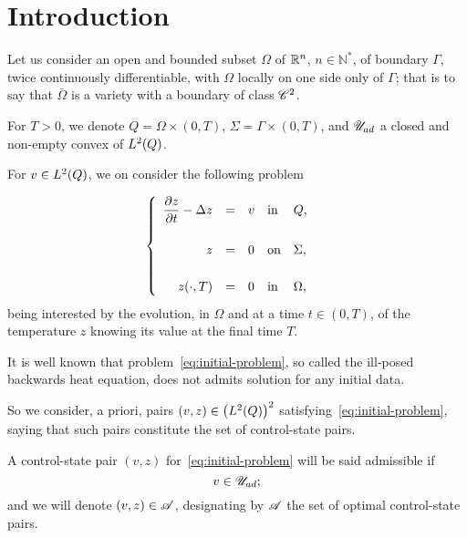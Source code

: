 \section{Introduction}

Let us consider an open and bounded subset $\Omega$ of ${\mathbb{R}}^{n}$, $n\in
{\mathbb{N}}^{*}$, of boundary ${\Gamma}$, twice continuously
differentiable, with $\Omega$ locally on one side only of $\Gamma$; that is
to say that $\bar{\Omega}$ is a variety with a boundary of class
${\mathscr{C}}^{2}$.

For $T > 0$, we denote $\displaystyle Q = \Omega\times(0,T)$, $\displaystyle
\Sigma = \Gamma\times (0,T)$, and $\displaystyle {\mathscr{U}}_{ad}$ a closed and
non-empty convex of $L^{2}\!\left({Q}\right)$.

For $v\in L^{2}\!\left({Q}\right)$, we on consider the following problem

\begin{equation}\label{eq:initial-problem}
    \begin{cases}\displaystyle
        \begin{array}{rclll}
            \dfrac{\partial{}z}{\partial{}t} - \Delta z & = & v & \text{in} & Q,\\
            \\
            z & = & 0 & \text{on} & \Sigma,\\
            \\
            {z}\!\left({\cdot,T}\right) & = & 0 & \text{in} & \Omega,
        \end{array}
    \end{cases}
\end{equation}
being interested by the evolution, in $\Omega$ and at a time $t\in (0,T)$,
of the temperature $z$ knowing its value at the final time $T$.

It is well known that problem~\eqref{eq:initial-problem}, so called the
ill-posed backwards heat equation, does not admits solution for any initial
data.

So we consider, a priori, pairs $(v,z)\in {\left({L^{2}\!\left({Q}\right)}\right)}^{2}$
satisfying~\eqref{eq:initial-problem}, saying that such pairs constitute
the set of control-state pairs.

A control-state pair $(v,z)$ for~\eqref{eq:initial-problem} will be said
admissible if
\begin{equation*}\label{eq:admissible-control-state-pair}
    v\in {\mathscr{U}}_{ad};
\end{equation*}
and we will denote $(v,z)\in \mathscr{A}$, designating by $\mathscr{A}$ the set of
optimal control-state pairs.

